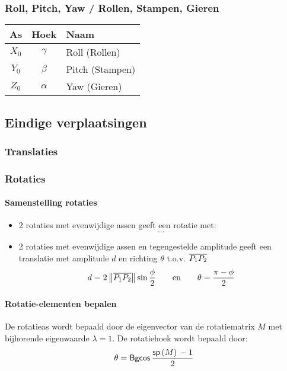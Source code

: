   \subsubsection{Roll, Pitch, Yaw / Rollen, Stampen, Gieren}
  \begin{tabular}{|c|c|l|}
    \hline
     \textbf{As} & \textbf{Hoek} & \textbf{Naam} \\
    \hline
    $X_0$   & $\gamma$ & Roll (Rollen)\\
    $Y_0$   & $\beta$  & Pitch (Stampen)\\
    $Z_0$   & $\alpha$ & Yaw (Gieren)\\
    \hline
  \end{tabular}

\subsection{Eindige verplaatsingen}

\subsubsection{Translaties}

\subsubsection{Rotaties}

\paragraph{Samenstelling rotaties}
\begin{itemize}
  \item 2 rotaties met evenwijdige assen geeft een rotatie met:
  \[
    \ldots
  \]

  \item 2 rotaties met evenwijdige assen en tegengestelde amplitude geeft een translatie met amplitude $d$ en richting $\theta$ t.o.v. $\overline{P_1 P_2}$
    \[
      d = 2 \left\| \overline{P_1 P_2} \right\| \sin{\frac{\phi}{2}}
      \qquad
      \mbox{en}
      \qquad
      \theta = \frac{\pi - \phi}{2}
    \]
\end{itemize}

\paragraph{Rotatie-elementen bepalen}
De rotatieas wordt bepaald door de eigenvector van de rotatiematrix $M$ met bijhorende eigenwaarde $\lambda = 1$.
De rotatiehoek wordt bepaald door:
  \[
    \theta = \mbox{\textsf{Bgcos}}\,{\frac{\mbox{\textsf{sp}}\left( M \right)\, - 1}{2}}
  \]

